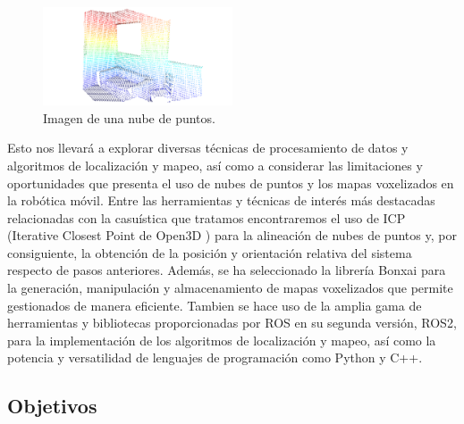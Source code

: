 \documentclass[12pt, a4paper, twoside]{article}
\begin{document}
\begin{figure}[h]
  \centering
    \includegraphics[width=0.5\textwidth]{Point_cloud_example.png}
  \caption{Imagen de una nube de puntos.}
\end{figure}
Esto nos llevará a explorar diversas técnicas de procesamiento de datos y algoritmos de localización y mapeo, así como a 
considerar las limitaciones y oportunidades que presenta el uso de nubes de puntos y los mapas voxelizados en la 
robótica móvil. \newline
Entre las herramientas y técnicas de interés más destacadas relacionadas con la casuística que tratamos encontraremos 
el uso de ICP (Iterative Closest Point de Open3D \cite{Zhou2018}) para la alineación de nubes de puntos y, por consiguiente, la 
obtención de la posición y orientación relativa del sistema respecto de pasos anteriores. Además, se ha seleccionado la librería 
Bonxai\cite{faconti2024bonxai} para la generación, manipulación y almacenamiento de mapas voxelizados que permite gestionados de 
manera eficiente. Tambien se hace uso de la amplia gama de herramientas y bibliotecas proporcionadas por ROS\cite{doi:10.1126/scirobotics.abm6074} 
en su segunda versión, ROS2, para la implementación de los algoritmos de localización y mapeo, así como la potencia y 
versatilidad de lenguajes de programación como Python y C++. \newline

\subsection{Objetivos}
\end{document}
